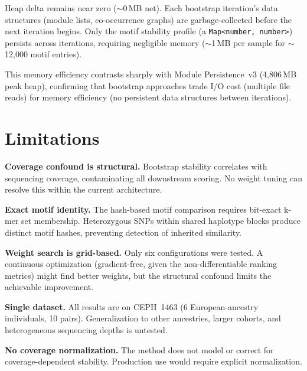 \documentclass{../yalumba}
\begin{document}
Heap delta remains near zero ($\sim$0\,MB net).  Each bootstrap iteration's
data structures (module lists, co-occurrence graphs) are garbage-collected
before the next iteration begins.  Only the motif stability profile
(a \texttt{Map<number, number>}) persists across iterations, requiring
negligible memory ($\sim$1\,MB per sample for $\sim$12{,}000 motif entries).

This memory efficiency contrasts sharply with Module Persistence~v3
(4{,}806\,MB peak heap), confirming that bootstrap approaches trade I/O
cost (multiple file reads) for memory efficiency (no persistent data
structures between iterations).


\section{Limitations}
\label{sec:limitations}

\begin{limitation}
\textbf{Coverage confound is structural.}  Bootstrap stability correlates
with sequencing coverage, contaminating all downstream scoring.  No weight
tuning can resolve this within the current architecture.
\end{limitation}

\begin{limitation}
\textbf{Exact motif identity.}  The hash-based motif comparison requires
bit-exact k-mer set membership.  Heterozygous SNPs within shared haplotype
blocks produce distinct motif hashes, preventing detection of inherited
similarity.
\end{limitation}

\begin{limitation}
\textbf{Weight search is grid-based.}  Only six configurations were tested.
A continuous optimization (gradient-free, given the non-differentiable
ranking metrics) might find better weights, but the structural confound
limits the achievable improvement.
\end{limitation}

\begin{limitation}
\textbf{Single dataset.}  All results are on CEPH~1463 (6 European-ancestry
individuals, 10 pairs).  Generalization to other ancestries, larger cohorts,
and heterogeneous sequencing depths is untested.
\end{limitation}

\begin{limitation}
\textbf{No coverage normalization.}  The method does not model or correct
for coverage-dependent stability.  Production use would require explicit
normalization.
\end{limitation}
\end{document}
